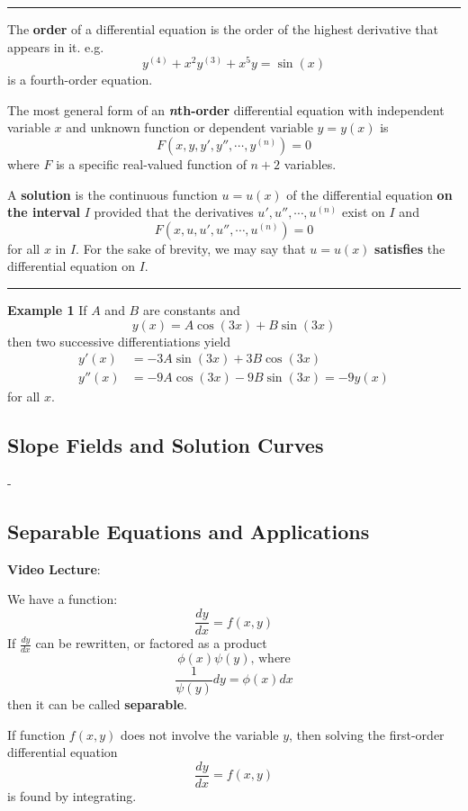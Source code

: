 \documentclass{article}
\begin{document}
\par\noindent\rule{\textwidth}{0.4pt}

The \textbf{order} of a differential equation is the order of the highest derivative that appears in it. e.g.
$$ y^{(4)} + x^2y^{(3)} + x^5y = \sin(x) $$
is a fourth-order equation.

The most general form of an \textbf{\textit{n}th-order} differential equation with independent variable $ x $ and unknown function or dependent variable $ y= y(x) $ is
$$ F \left( x,y,y',y'',\cdots,y^{(n)} \right) = 0 $$
where $ F $ is a specific real-valued function of $ n + 2 $ variables.

A \textbf{solution} is the continuous function $ u = u(x) $ of the differential equation \textbf{on the interval} $ I $ provided that the derivatives $ u',u'',\cdots,u^{(n)} $ exist on $ I $ and
$$ F \left( x,u,u',u'',\cdots,u^{(n)} \right) = 0 $$
for all $ x $ in  $ I $. For the sake of brevity, we may say that $ u = u(x) $ \textbf{satisfies} the differential equation on $ I $.

\par\noindent\rule{\textwidth}{0.4pt}

\textbf{Example 1}
If $ A $ and $ B $ are constants and
$$ y(x) = A\cos(3x) + B\sin(3x) $$
then two successive differentiations yield 
\begin{align*}
    y'(x) & = -3A\sin(3x) + 3B\cos(3x) \\
    y''(x) & = -9A\cos(3x) - 9B\sin(3x) = -9y(x)
\end{align*}
for all $ x $.

\subsection{Slope Fields and Solution Curves}
-

\subsection{Separable Equations and Applications}

\textbf{Video Lecture}:

We have a function:
$$ \frac{dy}{dx} = f(x,y) $$
If $ \frac{dy}{dx} $ can be rewritten, or factored as a product
$$ \phi(x) \psi(y) \text{, where} $$
$$ \frac{1}{\psi(y)}dy = \phi(x)dx $$
then it can be called \textbf{separable}.

\hr

If function $ f(x,y) $ does not involve the variable $ y $, then solving the first-order differential equation
$$ \frac{dy}{dx} = f(x,y) $$
is found by integrating.
\end{document}
